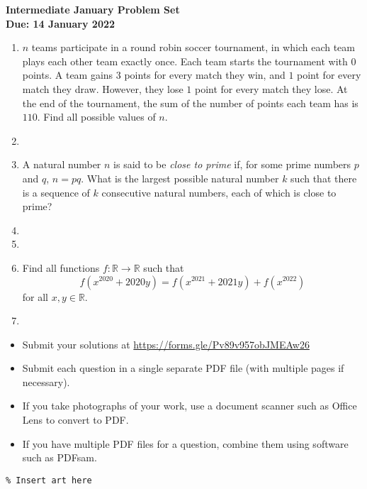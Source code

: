 \documentclass{article}
\begin{document}
\thispagestyle{empty}

\begin{center}
  \textbf{\Large Intermediate January Problem Set}
  \\ \vspace{1em}
  \textbf{\large Due: 14 January 2022}
\end{center}

\bigskip

\begin{enumerate}[itemsep=\fill]

\item %
$n$ teams participate in a round robin soccer tournament, in which each team plays each other team exactly once. Each team starts the tournament with $0$ points. A team gains $3$ points for every match they win, and $1$ point for every match they draw. However, they lose $1$ point for every match they lose. At the end of the tournament, the sum of the number of points each team has is $110$. Find all possible values of $n$.

\item %
\item A natural number $n$ is said to be \textit{close to prime} if, for some prime numbers $p$ and $q$, $n = pq$. What is the largest possible natural number $k$ such that there is a sequence of $k$ consecutive natural numbers, each of which is close to prime?


\item %


\item %


\item %
Find all functions $f : \mathbb{R} \to \mathbb{R}$ such that
\[ f(x^{2020} +2020y) = f(x^{2021} +2021y) +f(x^{2022}) \]
for all $x,y \in \mathbb{R}$.


\item %

\end{enumerate}


\vfill
\small
\begin{itemize}
	\item Submit your solutions at \href{https://forms.gle/Pv89v957obJMEAw26}{https://forms.gle/Pv89v957obJMEAw26}
	\item Submit each question in a single separate PDF file (with multiple pages if necessary).
	\item If you take photographs of your work, use a document scanner such as Office Lens to convert to PDF.
	\item If you have multiple PDF files for a question, combine them using software such as PDFsam.
\end{itemize}

\vfill
\centering
\small
\begin{BVerbatim}
\end{BVerbatim}
\end{document}
